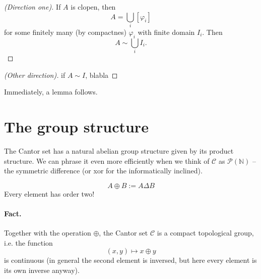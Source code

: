 
\begin{proof}[(Direction one)]
If \( A \) is clopen, then
\[ 
A = \bigcup_i \left[ \varphi_i \right] 
\]
for some finitely many (by compactnes) \( \varphi_i \) with finite domain \( I_i \). Then
\[ 
    A \sim \bigcup_i I_i. 
\]
\end{proof}

\begin{proof}[(Other direction)]
 if \( A \sim I \), blabla
\end{proof}

Immediately, a lemma follows.



\section{The group structure}

The Cantor set has a natural abelian group structure given by its product structure. We can phrase it even more efficiently when we think of \( \mathcal{C} \) as \( \mathcal{P}( \mathbb{N} ) \) -- the symmetric difference (or xor for the informatically inclined).

\[ 
    A \oplus B := A \Delta B 
\]
Every element has order two!

\paragraph{Fact.} Together with the operation \( \oplus \), the Cantor set \( \mathcal{C} \) is a compact topological group, i.e. the function
\[ 
    (x, y) \mapsto x \oplus y 
\]
is continuous (in general the second element is inversed, but here every element is its own inverse anyway). 

